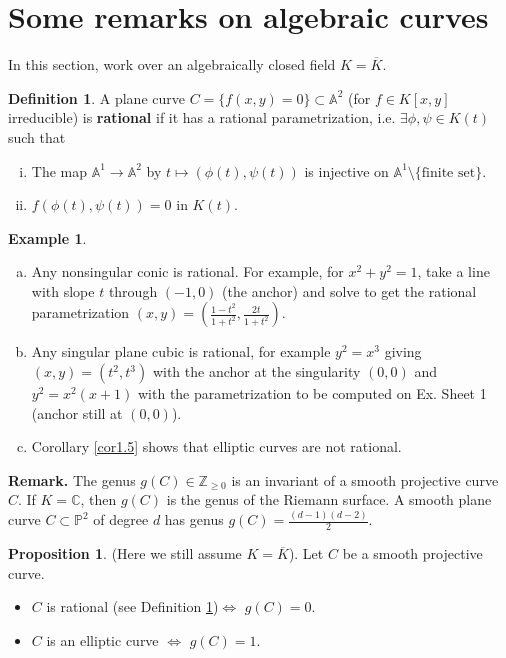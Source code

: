 \documentclass{article}
\theoremstyle{definition}
\newtheorem{prop}[theorem]{Proposition}
\newtheorem{example}{Example}[section]
\newtheorem{defn}{Definition}[section]
\begin{document}
\section{Some remarks on algebraic curves}


In this section, work over an algebraically closed field $K = \overline{K}$.

\begin{defn}\label{defn2.1}
    A plane curve $C = \{f(x,y) = 0\} \subset \mathbb{A}^2$ (for $f \in K[x,y]$ irreducible) is \textbf{rational} if it has a rational parametrization, i.e. $\exists \phi, \psi \in K(t)$ such that
    \begin{enumerate}[(i)]
        \item The map $\mathbb{A}^1 \to \mathbb{A}^2$ by $t \mapsto (\phi(t), \psi(t))$ is injective on $\mathbb{A}^1\setminus \{\text{finite set}\}$.
        \item $f(\phi(t),\psi(t))=0$ in $K(t)$.
    \end{enumerate}
\end{defn}
\begin{example}
    \begin{enumerate}[(a)]
        \item Any nonsingular conic is rational. For example, for $x^2+y^2=1$, take a line with slope $t$ through $(-1,0)$ (the anchor) and solve to get the rational parametrization $(x,y) = \left(\frac{1-t^2}{1+t^2},\frac{2t}{1+t^2}\right)$.
        \item Any singular plane cubic is rational, for example $y^2=x^3$ giving $(x,y) = (t^2, t^3)$ with the anchor at the singularity $(0,0)$ and $y^2 = x^2(x+1)$ with the parametrization to be computed on Ex. Sheet 1 (anchor still at $(0,0)$).
        \item Corollary \ref{cor1.5} shows that elliptic curves are not rational.
    \end{enumerate}
\end{example}
\textbf{Remark.}
The genus $g(C) \in \mathbb{Z}_{\ge 0}$ is an invariant of a smooth projective curve $C$. If $K=\mathbb{C}$, then $g(C)$ is the genus of the Riemann surface. A smooth plane curve $C \subset \mathbb{P}^2$ of degree $d$ has genus $g(C) = \frac{(d-1)(d-2)}{2}$.
\begin{prop}
    (Here we still assume $K = \overline{K}$). Let $C$ be a smooth projective curve.
    \begin{itemize}
        \item $C$ is rational (see Definition \ref{defn2.1})$\iff$ $g(C)=0$.
        \item $C$ is an elliptic curve $\iff$ $g(C)=1$.
    \end{itemize}
\end{prop}
\end{document}
